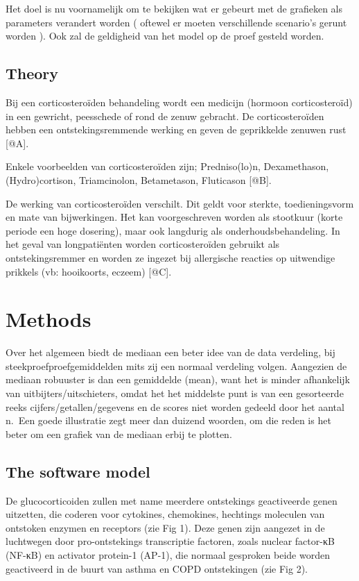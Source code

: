\documentclass[
]{article}
\begin{document}
Het doel is nu voornamelijk om te bekijken wat er gebeurt met de
grafieken als parameters verandert worden ( oftewel er moeten
verschillende scenario's gerunt worden ). Ook zal de geldigheid van het
model op de proef gesteld worden.

\hypertarget{theory}{%
\subsection{Theory}\label{theory}}

Bij een corticosteroïden behandeling wordt een medicijn (hormoon
corticosteroïd) in een gewricht, peesschede of rond de zenuw gebracht.
De corticosteroïden hebben een ontstekingsremmende werking en geven de
geprikkelde zenuwen rust {[}@A{]}.

Enkele voorbeelden van corticosteroïden zijn; Predniso(lo)n,
Dexamethason, (Hydro)cortison, Triamcinolon, Betametason, Fluticason
{[}@B{]}.

De werking van corticosteroïden verschilt. Dit geldt voor sterkte,
toedieningsvorm en mate van bijwerkingen. Het kan voorgeschreven worden
als stootkuur (korte periode een hoge dosering), maar ook langdurig als
onderhoudsbehandeling. In het geval van longpatiënten worden
corticosteroïden gebruikt als ontstekingsremmer en worden ze ingezet bij
allergische reacties op uitwendige prikkels (vb: hooikoorts, eczeem)
{[}@C{]}.

\hypertarget{methods}{%
\section{Methods}\label{methods}}

Over het algemeen biedt de mediaan een beter idee van de data verdeling,
bij steekproefproefgemiddelden mits zij een normaal verdeling volgen.
Aangezien de mediaan robuuster is dan een gemiddelde (mean), want het is
minder afhankelijk van uitbijters/uitschieters, omdat het het middelste
punt is van een gesorteerde reeks cijfers/getallen/gegevens en de scores
niet worden gedeeld door het aantal n.~Een goede illustratie zegt meer
dan duizend woorden, om die reden is het beter om een grafiek van de
mediaan erbij te plotten.

\hypertarget{the-software-model}{%
\subsection{The software model}\label{the-software-model}}

De glucocorticoiden zullen met name meerdere ontstekings geactiveerde
genen uitzetten, die coderen voor cytokines, chemokines, hechtings
moleculen van ontstoken enzymen en receptors (zie Fig 1). Deze genen
zijn aangezet in de luchtwegen door pro-ontstekings transcriptie
factoren, zoals nuclear factor-κB (NF-κB) en activator protein-1 (AP-1),
die normaal gesproken beide worden geactiveerd in de buurt van asthma en
COPD ontstekingen (zie Fig 2).
\end{document}

